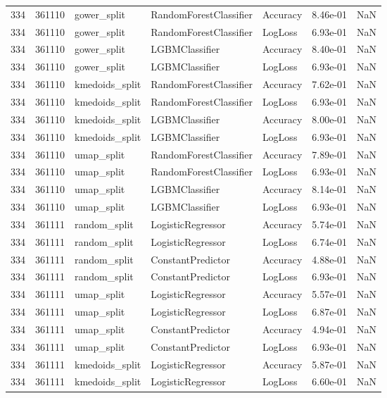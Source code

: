 \begin{tabular}{rrlllrr}
334 & 361110 & gower\_split & RandomForestClassifier & Accuracy & 8.46e-01 & NaN \\
334 & 361110 & gower\_split & RandomForestClassifier & LogLoss & 6.93e-01 & NaN \\
334 & 361110 & gower\_split & LGBMClassifier & Accuracy & 8.40e-01 & NaN \\
334 & 361110 & gower\_split & LGBMClassifier & LogLoss & 6.93e-01 & NaN \\
334 & 361110 & kmedoids\_split & RandomForestClassifier & Accuracy & 7.62e-01 & NaN \\
334 & 361110 & kmedoids\_split & RandomForestClassifier & LogLoss & 6.93e-01 & NaN \\
334 & 361110 & kmedoids\_split & LGBMClassifier & Accuracy & 8.00e-01 & NaN \\
334 & 361110 & kmedoids\_split & LGBMClassifier & LogLoss & 6.93e-01 & NaN \\
334 & 361110 & umap\_split & RandomForestClassifier & Accuracy & 7.89e-01 & NaN \\
334 & 361110 & umap\_split & RandomForestClassifier & LogLoss & 6.93e-01 & NaN \\
334 & 361110 & umap\_split & LGBMClassifier & Accuracy & 8.14e-01 & NaN \\
334 & 361110 & umap\_split & LGBMClassifier & LogLoss & 6.93e-01 & NaN \\
334 & 361111 & random\_split & LogisticRegressor & Accuracy & 5.74e-01 & NaN \\
334 & 361111 & random\_split & LogisticRegressor & LogLoss & 6.74e-01 & NaN \\
334 & 361111 & random\_split & ConstantPredictor & Accuracy & 4.88e-01 & NaN \\
334 & 361111 & random\_split & ConstantPredictor & LogLoss & 6.93e-01 & NaN \\
334 & 361111 & umap\_split & LogisticRegressor & Accuracy & 5.57e-01 & NaN \\
334 & 361111 & umap\_split & LogisticRegressor & LogLoss & 6.87e-01 & NaN \\
334 & 361111 & umap\_split & ConstantPredictor & Accuracy & 4.94e-01 & NaN \\
334 & 361111 & umap\_split & ConstantPredictor & LogLoss & 6.93e-01 & NaN \\
334 & 361111 & kmedoids\_split & LogisticRegressor & Accuracy & 5.87e-01 & NaN \\
334 & 361111 & kmedoids\_split & LogisticRegressor & LogLoss & 6.60e-01 & NaN \\

\end{tabular}
